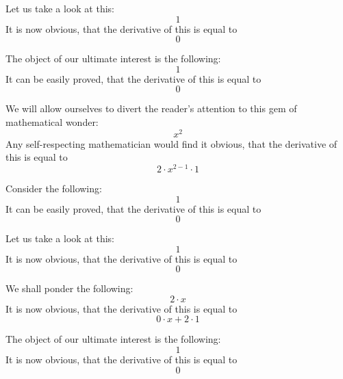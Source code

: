 \documentclass{article}
\begin{document}
Let us take a look at this:
\begin{equation}
1 
\end{equation}
It is now obvious, that the derivative of this is equal to
\begin{equation}
0 
\end{equation}

The object of our ultimate interest is the following:
\begin{equation}
1 
\end{equation}
It can be easily proved, that the derivative of this is equal to
\begin{equation}
0 
\end{equation}

We will allow ourselves to divert the reader's attention to this gem of mathematical wonder:
\begin{equation}
x ^{2 } 
\end{equation}
Any self-respecting mathematician would find it obvious, that the derivative of this is equal to
\begin{equation}
2 \cdot x ^{2 - 1 } \cdot 1 
\end{equation}

Consider the following:
\begin{equation}
1 
\end{equation}
It can be easily proved, that the derivative of this is equal to
\begin{equation}
0 
\end{equation}

Let us take a look at this:
\begin{equation}
1 
\end{equation}
It is now obvious, that the derivative of this is equal to
\begin{equation}
0 
\end{equation}

We shall ponder the following:
\begin{equation}
2 \cdot x 
\end{equation}
It is now obvious, that the derivative of this is equal to
\begin{equation}
0 \cdot x + 2 \cdot 1 
\end{equation}

The object of our ultimate interest is the following:
\begin{equation}
1 
\end{equation}
It is now obvious, that the derivative of this is equal to
\begin{equation}
0 
\end{equation}
\end{document}
